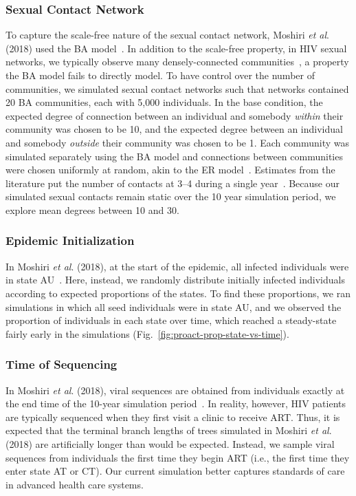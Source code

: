 \subsubsection{Sexual Contact Network}
To capture the scale-free nature of the sexual contact network, Moshiri \textit{et al}. (2018) used the \gls{BA} model~\cite{Barabasi1999}. In addition to the scale-free property, in \gls{HIV} sexual networks, we typically observe many densely-connected communities~\cite{Rothenberg1998}, a property the \gls{BA} model fails to directly model. To have control over the number of communities,  we simulated sexual contact networks such that networks contained 20 \gls{BA} communities, each with 5,000 individuals. In the base condition, the expected degree of connection between an individual and somebody \textit{within} their community was chosen to be 10, and the expected degree between an individual and somebody \textit{outside} their community was chosen to be 1. Each community was simulated separately using the \gls{BA} model and connections between communities were chosen uniformly at random, akin to the \gls{ER} model~\cite{Erdos1959}. Estimates from the literature put the number of contacts at 3--4 during a single year~\cite{Rosenberg2011}. Because our simulated sexual contacts remain static over the 10 year simulation period, we explore mean degrees between 10 and 30.

\subsubsection{Epidemic Initialization}
In Moshiri \textit{et al}. (2018), at the start of the epidemic, all infected individuals were in state AU~\cite{Moshiri2018}. Here, instead, we randomly distribute initially infected individuals according to expected proportions of the states. To find these proportions, we ran simulations in which all seed individuals were in state AU, and we observed the proportion of individuals in each state over time, which reached a steady-state fairly early in the simulations (Fig.~\ref{fig:proact-prop-state-vs-time}).

\subsubsection{Time of Sequencing}
In Moshiri \textit{et al}. (2018), viral sequences are obtained from individuals exactly at the end time of the 10-year simulation period~\cite{Moshiri2018}. In reality, however, \gls{HIV} patients are typically sequenced when they first visit a clinic to receive \gls{ART}. Thus, it is expected that the terminal branch lengths of trees simulated in Moshiri \textit{et al}. (2018) are artificially longer than would be expected. Instead, we sample viral sequences from individuals the first time they begin \gls{ART} (i.e., the first time they enter state AT or CT). Our current simulation better captures standards of care in advanced health care systems.


